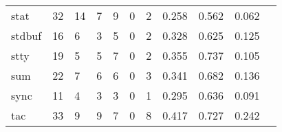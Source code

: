 \begin{longtable}{lp{1.2cm}p{1.2cm}p{1.2cm}p{1.2cm}p{1.2cm}p{1.2cm}p{1.2cm}p{1.2cm}p{1.2cm}p{1.2cm}}
stat      &                                    32 &                                                 14 &                                                  7 &                                                  9 &                                                  0 &                                                  2 &                                         0.258 &                                              0.562 &                                              0.062 \\
stdbuf    &                                    16 &                                                  6 &                                                  3 &                                                  5 &                                                  0 &                                                  2 &                                         0.328 &                                              0.625 &                                              0.125 \\
stty      &                                    19 &                                                  5 &                                                  5 &                                                  7 &                                                  0 &                                                  2 &                                         0.355 &                                              0.737 &                                              0.105 \\
sum       &                                    22 &                                                  7 &                                                  6 &                                                  6 &                                                  0 &                                                  3 &                                         0.341 &                                              0.682 &                                              0.136 \\
sync      &                                    11 &                                                  4 &                                                  3 &                                                  3 &                                                  0 &                                                  1 &                                         0.295 &                                              0.636 &                                              0.091 \\
tac       &                                    33 &                                                  9 &                                                  9 &                                                  7 &                                                  0 &                                                  8 &                                         0.417 &                                              0.727 &                                              0.242 \\

\end{longtable}
